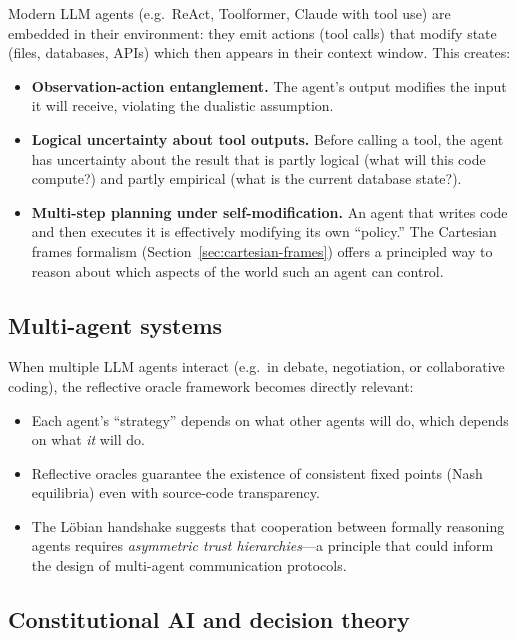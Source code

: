 \documentclass[11pt,a4paper]{article}
\theoremstyle{definition}
\theoremstyle{remark}
\begin{document}
Modern LLM agents (e.g.\ ReAct, Toolformer, Claude with tool use) are
embedded in their environment: they emit actions (tool calls) that
modify state (files, databases, APIs) which then appears in their
context window.  This creates:
\begin{itemize}
  \item \textbf{Observation-action entanglement.}  The agent's output
    modifies the input it will receive, violating the dualistic
    assumption.
  \item \textbf{Logical uncertainty about tool outputs.}  Before calling
    a tool, the agent has uncertainty about the result that is partly
    logical (what will this code compute?) and partly empirical (what is
    the current database state?).
  \item \textbf{Multi-step planning under self-modification.}  An agent
    that writes code and then executes it is effectively modifying its
    own ``policy.''  The Cartesian frames formalism (Section~\ref{sec:cartesian-frames})
    offers a principled way to reason about which aspects of the world
    such an agent can control.
\end{itemize}

\subsection{Multi-agent systems}

When multiple LLM agents interact (e.g.\ in debate, negotiation, or
collaborative coding), the reflective oracle framework becomes directly
relevant:
\begin{itemize}
  \item Each agent's ``strategy'' depends on what other agents will do,
    which depends on what \emph{it} will do.
  \item Reflective oracles guarantee the existence of consistent
    fixed points (Nash equilibria) even with source-code transparency.
  \item The L\"obian handshake suggests that cooperation between
    formally reasoning agents requires \emph{asymmetric trust
    hierarchies}---a principle that could inform the design of
    multi-agent communication protocols.
\end{itemize}

\subsection{Constitutional AI and decision theory}
\end{document}
